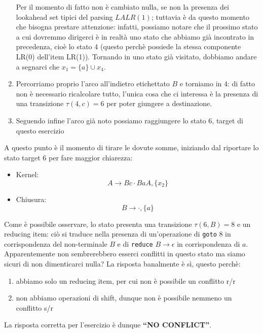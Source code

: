 \documentclass[class=book, crop=false, oneside, 12pt]{standalone}
\begin{document}
\begin{enumerate}
    Per il momento di fatto non è cambiato nulla, se non la presenza dei lookahead set tipici del parsing \(LALR(1)\); tuttavia è da questo momento che bisogna prestare attenzione: infatti, possiamo notare che il prossimo stato a cui dovremmo dirigerci è in realtà uno stato che abbiamo già incontrato in precedenza, cioè lo stato 4 (questo perchè possiede la stessa componente LR(0) dell'item LR(1)). Tornando in uno stato già visitato, dobbiamo andare a segnarci che \(x_1 = \{a\} \cup x_4\).
    \item Percorriamo proprio l'arco all'indietro etichettato \(B\) e torniamo in 4: di fatto non è necessario ricalcolare tutto, l'unica cosa che ci interessa è la presenza di una transizione \(\tau(4,c) = 6\) per poter giungere a destinazione. 
    \item Seguendo infine l'arco già noto possiamo raggiungere lo stato 6, target di questo esercizio
\end{enumerate}
A questo punto è il momento di tirare le dovute somme, iniziando dal riportare lo stato target 6 per fare maggior chiarezza:
\begin{itemize}
    \item Kernel:
    \begin{equation*}
        A \to Bc \cdot BaA, \{x_2\} 
    \end{equation*}
    \item Chiusura:
    \begin{equation*}
        B \to \cdot, \{a\} 
    \end{equation*}
\end{itemize}

Come è possibile osservare, lo stato presenta una transizione \(\tau(6, B)=8\) e un reducing item: ciò si traduce nella presenza di un'operazione di \texttt{goto} 8 in corrispondenza del non-terminale \(B\) e di \texttt{reduce} \(B \to \epsilon\) in corrispondenza di \(a\). Apparentemente non sembrerebbero esserci conflitti in questo stato ma siamo sicuri di non dimenticarci nulla? La risposta banalmente è sì, questo perchè:

\begin{enumerate}
    \item abbiamo solo un reducing item, per cui non è possibile un conflitto r/r
    \item non abbiamo operazioni di shift, dunque non è possibile nemmeno un conflitto s/r
\end{enumerate}

La risposta corretta per l'esercizio è dunque \textbf{“NO CONFLICT”}.
\end{document}
